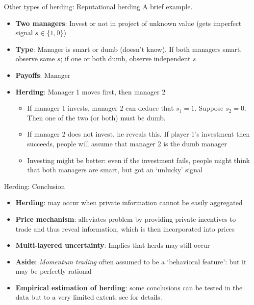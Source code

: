 \documentclass[english,10pt
,aspectratio=169
]{beamer}
\begin{document}
\begin{frame}{Other types of herding: Reputational herding}
	A brief example.
	\begin{itemize}
		\item \textbf{Two  managers}: Invest or not in project of unknown value (gets imperfect signal $s \in \{1,0\}$)
		\item \textbf{Type}: Manager is smart or dumb (doesn't know). If both managers smart, observe same $s$; if one or both dumb, observe independent $s$ %
		\item \textbf{Payoffs}:  Manager 
		\item \textbf{Herding}: Manager 1 moves first, then manager 2 
		\begin{itemize}
			\item If manager 1 invests, manager 2 can deduce that $s_1=1$. Suppose $s_2=0$. Then one of the two (or both) must be dumb. 
			\item If manager 2 does not invest, he reveals this. If player 1's  investment then succeeds, people will assume that manager 2 is the dumb manager
			\item Investing might be better: even if the investment fails, people might think that both managers are smart, but got an `unlucky' signal
		\end{itemize}
	\end{itemize}
\end{frame}


\begin{frame}{Herding: Conclusion}
	\begin{itemize}
		\item \textbf{Herding}: may occur when private information cannot be easily aggregated
		\item \textbf{Price mechanism}: alleviates problem by providing private incentives to trade and thus reveal information, which is then incorporated into prices
		\item \textbf{Multi-layered uncertainty}: Implies that herds may still occur 
		\item \textbf{Aside}: \emph{Momentum trading} often assumed to be a `behavioral feature': but it may be perfectly rational
		\item \textbf{Empirical estimation of herding}: some conclusions can be tested in the data but to a very limited extent; see \cite{bikhchandani_herd_2000} for details.
	\end{itemize}
\end{frame}
\end{document}
